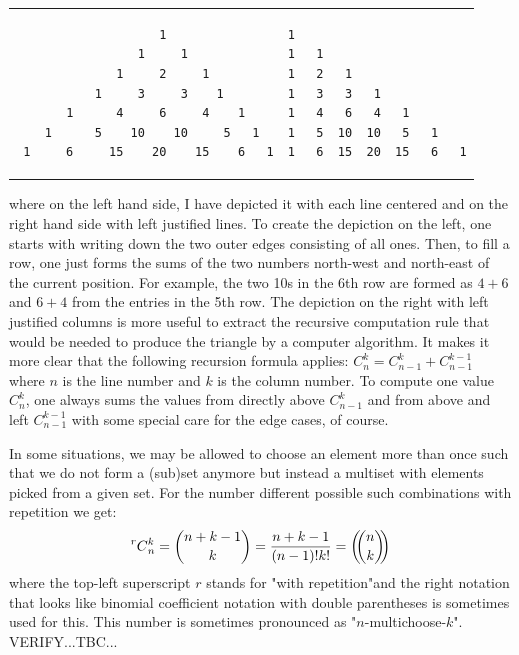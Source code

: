 \begin{tabular}{ m{10cm}  m{7cm} }
\begin{verbatim}
                    1
                 1     1
              1     2     1
           1     3     3    1
       1      4     6     4    1
    1      5    10    10     5   1
 1     6     15    20    15    6   1
\end{verbatim}
& 
\begin{verbatim}
1
1   1
1   2   1
1   3   3   1
1   4   6   4   1
1   5  10  10   5   1
1   6  15  20  15   6   1
\end{verbatim}
\end{tabular}

where on the left hand side, I have depicted it with each line centered and on the right hand side with left justified lines. To create the depiction on the left, one starts with writing down the two outer edges consisting of all ones. Then, to fill a row, one  just forms the sums of the two numbers north-west and north-east of the current position. For example, the two 10s in the 6th row are formed as $4+6$ and $6+4$ from the entries in the 5th row. The depiction on the right with left justified columns is more useful to extract the recursive computation rule that would be needed to produce the triangle by a computer algorithm. It makes it more clear that the following recursion formula applies: $C_n^k = C_{n-1}^k + C_{n-1}^{k-1}$ where $n$ is the line number and $k$ is the column number. To compute one value $C_n^k$, one always sums the values from directly above $C_{n-1}^k$ and from above and left $C_{n-1}^{k-1}$ with some special care for the edge cases, of course.


%
%


\medskip
In some situations, we may be allowed to choose an element more than once such that we do not form a (sub)set anymore but instead a multiset with elements picked from a given set. For the number different possible such combinations with repetition we get:
\begin{equation}
\prescript{r}{}{C}_n^k
= \binom{n+k-1}{k}
= \frac{n+k-1}{(n-1)! k!}
= \left(\!\!{n\choose k}\!\!\right)
\end{equation}
where the top-left superscript $r$ stands for "with repetition"and the right notation that looks like binomial coefficient notation with double parentheses is sometimes used for this. This number is sometimes pronounced as "$n$-multichoose-$k$". VERIFY...TBC...

